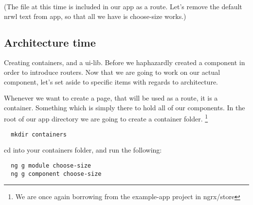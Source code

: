 (The file at this time is included in our app as a route. Let's remove the
default nrwl text from app, so that all we have is choose-size works.)

\subsection{Architecture time}

Creating containers, and a ui-lib. Before we haphazardly created a component in
order to introduce routers. Now that we are going to work on our actual component,
let's set aside to specific items with regards to architecture.

Whenever we want to create a page, that will be used as a route, it is a container.
Something which is simply there to hold all of our components. In the root of
our app directory we are going to create a container folder. \footnote{We are
once again borrowing from the example-app project in ngrx/store}
\begin{verbatim}
  mkdir containers
\end{verbatim}

cd into your containers folder, and run the following:
\begin{verbatim}
  ng g module choose-size
  ng g component choose-size
\end{verbatim}
